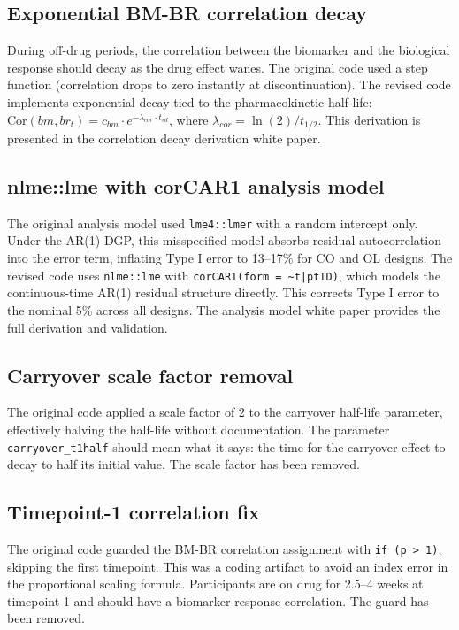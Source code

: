 \documentclass[11pt]{article}
\begin{document}
\subsection{Exponential BM-BR correlation decay}

During off-drug periods, the correlation between the biomarker
and the biological response should decay as the drug effect wanes.
The original code used a step function (correlation drops to zero
instantly at discontinuation). The revised code implements
exponential decay tied to the pharmacokinetic half-life:
$\text{Cor}(bm, br_t) = c_{bm} \cdot e^{-\lambda_{cor} \cdot
t_{sd}}$, where $\lambda_{cor} = \ln(2) / t_{1/2}$. This
derivation is presented in the correlation decay derivation white
paper.

\subsection{nlme::lme with corCAR1 analysis model}

The original analysis model used \texttt{lme4::lmer} with a random
intercept only. Under the AR(1) DGP, this misspecified model
absorbs residual autocorrelation into the error term, inflating
Type I error to 13--17\% for CO and OL designs. The revised code
uses \texttt{nlme::lme} with \texttt{corCAR1(form = \~{}t|ptID)}, which models
the continuous-time AR(1) residual structure directly. This
corrects Type I error to the nominal 5\% across all designs. The
analysis model white paper provides the full derivation and
validation.

\subsection{Carryover scale factor removal}

The original code applied a scale factor of 2 to the carryover
half-life parameter, effectively halving the half-life without
documentation. The parameter \texttt{carryover\_t1half} should mean what
it says: the time for the carryover effect to decay to half its
initial value. The scale factor has been removed.

\subsection{Timepoint-1 correlation fix}

The original code guarded the BM-BR correlation assignment with
\texttt{if (p > 1)}, skipping the first timepoint. This was a coding
artifact to avoid an index error in the proportional scaling
formula. Participants are on drug for 2.5--4 weeks at timepoint 1
and should have a biomarker-response correlation. The guard has
been removed.
\end{document}
